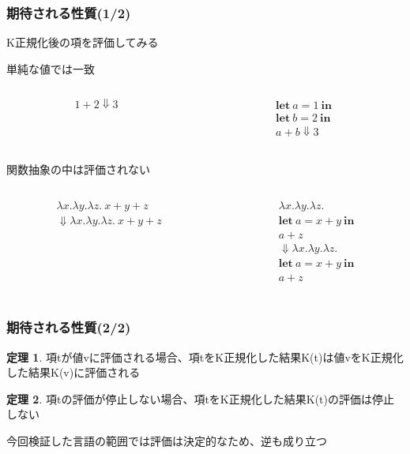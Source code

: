 \documentclass[dvipdfmx,cjk,xcolor=dvipsnames,envcountsect,notheorems,12pt]{beamer}
\theoremstyle{definition}
\newtheorem{theorem}{定理}
\newcommand{\keyword}[1]{\mathbf{#1}}
\newcommand{\LET}{\keyword{let}}
\newcommand{\IN}{\keyword{in}}
\begin{document}
\begin{frame}
	\frametitle{期待される性質(1/2)}
	{\LARGE K正規化後の項を評価してみる}

	\vfill

	\Large 単純な値では一致
	{\normalsize \begin{columns}
		\begin{column}{0.4\textwidth}
			\[ 1+2\Downarrow 3 \]
		\end{column}
		\begin{column}{0.4\textwidth}
			\[ 
				\begin{array}{l}
					\LET~a = 1~\IN \\
					\LET~b = 2~\IN \\
					a + b\Downarrow 3
				\end{array}
			\]
		\end{column}
	\end{columns}}

	\vfill

	関数抽象の中は評価されない
	{\normalsize \begin{columns}
		\begin{column}{0.4\textwidth}
			\[
				\begin{array}{l}
					\lambda x.\lambda y.\lambda z.~x+y+z\\
					\Downarrow \lambda x.\lambda y.\lambda z.~x+y+z
				\end{array}
			\]
		\end{column}
		\begin{column}{0.4\textwidth}
			\[ 
				\begin{array}{l}
					\lambda x.\lambda y.\lambda z.\\
					\LET~a = x+y~\IN \\
					a + z \\
					\Downarrow \lambda x.\lambda y.\lambda z.\\
					\LET~a = x+y~\IN \\
					a + z \\
				\end{array}
			\]
		\end{column}
	\end{columns}}
\end{frame}

\begin{frame}
	\frametitle{期待される性質(2/2)}
	{\Large
	\begin{theorem}
		項tが値vに評価される場合、項tをK正規化した結果K(t)は値vをK正規化した結果K(v)に評価される
	\end{theorem}
	\begin{theorem}
		項tの評価が停止しない場合、項tをK正規化した結果K(t)の評価は停止しない
	\end{theorem}}
	\Large 今回検証した言語の範囲では評価は決定的なため、逆も成り立つ

\end{frame}
\end{document}
